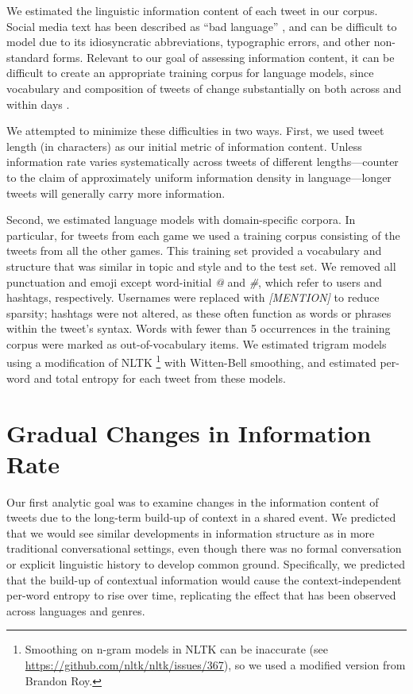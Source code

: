 \documentclass[11pt,letterpaper]{article}
\begin{document}
We estimated the linguistic information content of each tweet in our corpus. Social media text has been described as ``bad language'' \cite{eisenstein2013}, and can be difficult to model due to its idiosyncratic abbreviations, typographic errors, and other non-standard forms. Relevant to our goal of assessing information content, it can be difficult to create an appropriate training corpus for language models, since vocabulary and composition of tweets of change substantially on both across and within days \cite{eisenstein2013}.

We attempted to minimize these difficulties in two ways.  First, we used tweet length (in characters) as our initial metric of information content. Unless information rate varies systematically across tweets of different lengths---counter to the claim of approximately uniform information density in language\cite{genzel2002,levy2007}---longer tweets will generally carry more information.

Second, we estimated language models with domain-specific corpora. In particular, for tweets from each game we used a training corpus consisting of the tweets from all the other games. This training set provided a vocabulary and structure that was similar in topic and style and to the test set.  We removed all punctuation and emoji except word-initial {\it @} and {\it \#}, which refer to users and hashtags, respectively.  Usernames were replaced with {\it [MENTION]} to reduce sparsity; hashtags were not altered, as these often function as words or phrases within the tweet's syntax.  Words with fewer than 5 occurrences in the training corpus were marked as out-of-vocabulary items. We estimated trigram models using a modification of NLTK \cite{bird2006}\footnote{Smoothing on n-gram models in NLTK can be inaccurate (see \url{https://github.com/nltk/nltk/issues/367}), so we used a modified version from Brandon Roy.} with Witten-Bell smoothing, and estimated per-word and total entropy for each tweet from these models.


\section{Gradual Changes in Information Rate}

Our first analytic goal was to examine changes in the information content of tweets due to the long-term build-up of context in a shared event.  We predicted that we would see similar developments in information structure as in more traditional conversational settings, even though there was no formal conversation or explicit linguistic history to develop common ground.  Specifically, we predicted that the build-up of contextual information would cause the context-independent per-word entropy to rise over time, replicating the effect that has been observed across languages and genres\cite{genzel2002,genzel2003,qian2012}.
\end{document}
